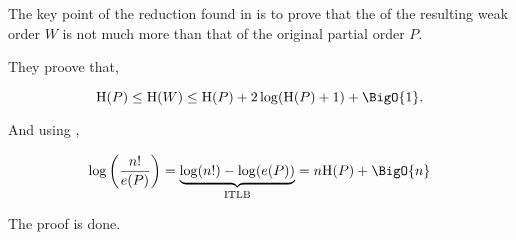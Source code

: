 \section{}
\label{tree:POP:itlb}

The key point of the reduction found in \cite{jcardin1} is to prove that the  of the resulting weak order $W$ is not much more than that of the original partial order $P$.

They proove that,

\begin{equation}
\text{H}(P) \leq \text{H}(W) \leq \text{H}(P) + 2 \log(\text{H}(P) + 1) + \BigO{1}.
\label{eq:jcardin1}
\end{equation}


And using \cite{kahnkim1},

\begin{equation}
\log\left(\frac{n!}{e(P)}\right) = \underbrace{\log(n!) - \log(e(P))}_\text{ITLB} = n \text{H}(P) + \BigO{n}
\label{eq:khankim1}
\end{equation}

The proof is done.
